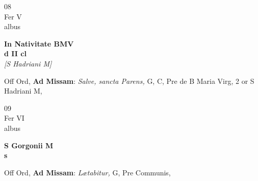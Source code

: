 \documentclass[10pt, openany]{book}
\begin{document}
        \begin{center}
            \begin{minipage}{3.5in}
                \vspace{2em}
                \begin{minipage}{0.5in}
                    {\Huge 08} \\
                    {\normalsize Fer V} \\
                    {\normalsize albus}
                \end{minipage}
                \begin{minipage}{3.0in}
                    \textbf{ \large In Nativitate BMV \\
                    \textnormal{\normalsize d II cl}} \\ \textit{[S Hadriani M]} \\ 
                \end{minipage}
                \begin{justify}Off Ord, \textbf{Ad Missam}: \textit{Salve, sancta Parens,} G, C, Pre de B Maria Virg, 2 or S Hadriani M,   
                \end{justify}
            \end{minipage}
        \end{center}
    
        \begin{center}
            \begin{minipage}{3.5in}
                \vspace{2em}
                \begin{minipage}{0.5in}
                    {\Huge 09} \\
                    {\normalsize Fer VI} \\
                    {\normalsize albus}
                \end{minipage}
                \begin{minipage}{3.0in}
                    \textbf{ \large S Gorgonii M \\
                    \textnormal{\normalsize s}} \\ 
                \end{minipage}
                \begin{justify}Off Ord, \textbf{Ad Missam}: \textit{Lætabitur,} G, Pre Communis,   
                \end{justify}
            \end{minipage}
        \end{center}
    
\end{document}
